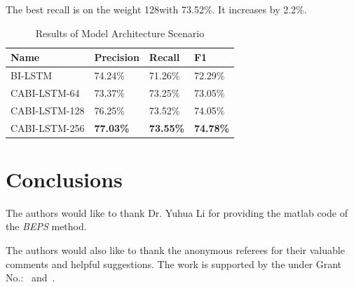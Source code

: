 The best recall is on the weight 128with 73.52\%. It increases by 2.2\%.

\begin{table}
	\caption{Results of Model Architecture Scenario}
	\label{tab:architecure_scenario}
	\begin{tabular}{llll}
		\toprule
		Name			&Precision					&Recall		&F1			\\
		\midrule
		BI-LSTM				&	74.24\%				&	71.26\%				&	72.29\%	\\
		CABI-LSTM-64		&	73.37\%				&	73.25\%				&	73.05\%	\\
		CABI-LSTM-128		&	76.25\%				&	73.52\%				&	74.05\%	\\
		CABI-LSTM-256		&	\textbf{77.03\%}	&	\textbf{73.55\%}	&	\textbf{74.78\%}\\
		\bottomrule
	\end{tabular}
\end{table}


\section{Conclusions}



\begin{acks}
  The authors would like to thank Dr. Yuhua Li for providing the
  matlab code of  the \textit{BEPS} method. 

  The authors would also like to thank the anonymous referees for
  their valuable comments and helpful suggestions. The work is
  supported by the  under Grant
  No.:~
  and~.

\end{acks}
